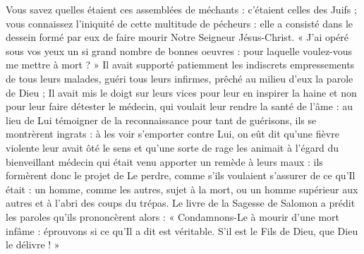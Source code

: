  Vous savez quelles étaient ces assemblées de méchants : c’étaient celles des Juifs ; vous connaissez l’iniquité de cette multitude de pécheurs : elle a consisté dans le dessein formé par eux de faire mourir Notre Seigneur Jésus-Christ. « J’ai opéré sous vos yeux un si grand nombre de bonnes oeuvres : pour laquelle voulez-vous me mettre à mort ? » Il avait supporté patiemment les indiscrets empressements de tous leurs malades, guéri tous leurs infirmes, prêché au milieu d’eux la parole de Dieu ; Il avait mis le doigt sur leurs vices pour leur en inspirer la haine et non pour leur faire détester le médecin, qui voulait leur rendre la santé de l’âme : au lieu de Lui témoigner de la reconnaissance pour tant de guérisons, ils se montrèrent ingrats : à les voir s’emporter contre Lui, on eût dit qu’une fièvre violente leur avait ôté le sens et qu’une sorte de rage les animait à l’égard du bienveillant médecin qui était venu apporter un remède à leurs maux : ils formèrent donc le projet de Le perdre, comme s’ils voulaient s’assurer de ce qu’Il était : un homme, comme les autres, sujet à la mort, ou un homme supérieur aux autres et à l’abri des coups du trépas. Le livre de la Sagesse de Salomon a prédit les paroles qu’ils prononcèrent alors : « Condamnons-Le à mourir d’une mort infâme : éprouvons si ce qu’Il a dit est véritable. S’il est le Fils de Dieu, que Dieu le délivre ! »